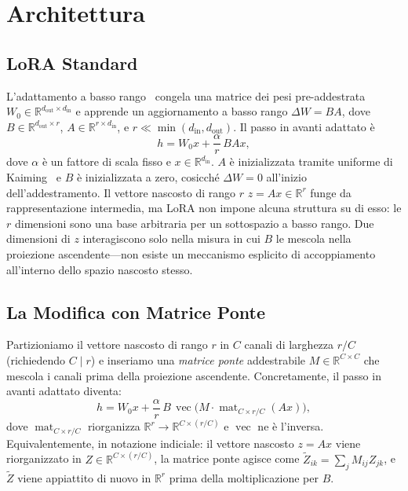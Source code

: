 \documentclass[11pt]{article}
\begin{document}

\section{Architettura}
\label{sec:architecture}

\subsection{LoRA Standard}
\label{sec:standard-lora}

L'adattamento a basso rango~\cite{hu2022lora} congela una matrice dei
pesi pre-addestrata $W_0 \in \mathbb{R}^{d_\text{out} \times d_\text{in}}$
e apprende un aggiornamento a basso rango $\Delta W = BA$, dove
$B \in \mathbb{R}^{d_\text{out} \times r}$,
$A \in \mathbb{R}^{r \times d_\text{in}}$, e
$r \ll \min(d_\text{in}, d_\text{out})$.
Il passo in avanti adattato \`e
\begin{equation}
  h = W_0 x + \frac{\alpha}{r}\, B A x,
  \label{eq:lora}
\end{equation}
dove $\alpha$ \`e un fattore di scala fisso e
$x \in \mathbb{R}^{d_\text{in}}$.
$A$ \`e inizializzata tramite uniforme di Kaiming~\cite{he2015delving}
e $B$ \`e inizializzata a zero, cosicch\'e $\Delta W = 0$ all'inizio
dell'addestramento.
Il vettore nascosto di rango $r$ $z = Ax \in \mathbb{R}^r$ funge da
rappresentazione intermedia, ma LoRA non impone alcuna struttura su di
esso: le $r$ dimensioni sono una base arbitraria per un sottospazio a
basso rango.
Due dimensioni di $z$ interagiscono solo nella misura in cui $B$ le
mescola nella proiezione ascendente---non esiste un meccanismo esplicito
di accoppiamento all'interno dello spazio nascosto stesso.

\subsection{La Modifica con Matrice Ponte}
\label{sec:bridge}

Partizioniamo il vettore nascosto di rango $r$ in $C$ canali di
larghezza $r / C$ (richiedendo $C \mid r$) e inseriamo una \emph{matrice
ponte} addestrabile $M \in \mathbb{R}^{C \times C}$ che mescola i
canali prima della proiezione ascendente.
Concretamente, il passo in avanti adattato diventa:
\begin{equation}
  h = W_0 x + \frac{\alpha}{r}\, B\,
    \operatorname{vec}\!\bigl(M \cdot
    \operatorname{mat}_{C \times r/C}(Ax)\bigr),
  \label{eq:bridge}
\end{equation}
dove $\operatorname{mat}_{C \times r/C}$ riorganizza $\mathbb{R}^r
\to \mathbb{R}^{C \times (r/C)}$ e $\operatorname{vec}$ ne \`e
l'inversa.
Equivalentemente, in notazione indiciale: il vettore nascosto $z = Ax$
viene riorganizzato in $Z \in \mathbb{R}^{C \times (r/C)}$, la matrice
ponte agisce come $\tilde{Z}_{ik} = \sum_j M_{ij} Z_{jk}$, e
$\tilde{Z}$ viene appiattito di nuovo in $\mathbb{R}^r$ prima della
moltiplicazione per $B$.
\end{document}
